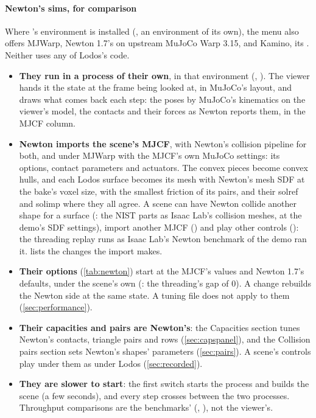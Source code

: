 \paragraph{Newton's sims, for comparison} Where 's environment is installed (, an environment of its own), the menu also offers MJWarp, Newton 1.7's  on upstream MuJoCo Warp 3.15, and Kamino, its . Neither uses any of Lodos's code.
\begin{itemize}
\item \textbf{They run in a process of their own}, in that environment (, ). The viewer hands it the state at the frame being looked at, in MuJoCo's layout, and draws what comes back each step: the poses by MuJoCo's kinematics on the viewer's model, the contacts and their forces as Newton reports them, in the MJCF column.
\item \textbf{Newton imports the scene's MJCF}, with Newton's collision pipeline for both, and under MJWarp with the MJCF's own MuJoCo settings: its options, contact parameters and actuators. The convex pieces become convex hulls, and each Lodos surface becomes its mesh with Newton's mesh SDF at the bake's voxel size, with the smallest friction of its pairs, and their solref and solimp where they all agree. A scene can have Newton collide another shape for a surface (: the NIST parts as Isaac Lab's collision meshes, at the demo's SDF settings), import another MJCF () and play other controls (): the threading replay runs as Isaac Lab's Newton benchmark of the demo ran it.  lists the changes the import makes.
\item \textbf{Their options} (\cref{tab:newton}) start at the MJCF's values and Newton 1.7's defaults, under the scene's own (: the threading's gap of 0). A change rebuilds the Newton side at the same state. A tuning file does not apply to them (\cref{sec:performance}).
\item \textbf{Their capacities and pairs are Newton's}: the Capacities section tunes Newton's contacts, triangle pairs and rows (\cref{sec:capspanel}), and the Collision pairs section sets Newton's shapes' parameters (\cref{sec:pairs}). A scene's controls play under them as under Lodos (\cref{sec:recorded}).
\item \textbf{They are slower to start}: the first switch starts the process and builds the scene (a few seconds), and every step crosses between the two processes. Throughput comparisons are the benchmarks' (, ), not the viewer's.
\end{itemize}

